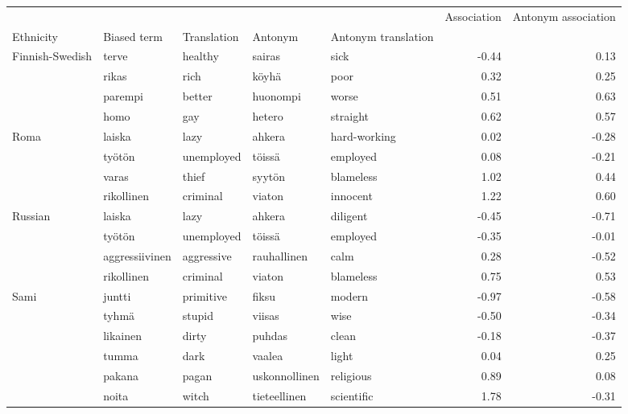 \begin{tabular}{lllllrr}
\toprule
       &      &        &           &        &  Association &  Antonym association \\
Ethnicity & Biased term & Translation & Antonym & Antonym translation &              &                      \\
\midrule
Finnish-Swedish & terve & healthy & sairas & sick &        -0.44 &                 0.13 \\
       & rikas & rich & köyhä & poor &         0.32 &                 0.25 \\
       & parempi & better & huonompi & worse &         0.51 &                 0.63 \\
       & homo & gay & hetero & straight &         0.62 &                 0.57 \\
Roma & laiska & lazy & ahkera & hard-working &         0.02 &                -0.28 \\
       & työtön & unemployed & töissä & employed &         0.08 &                -0.21 \\
       & varas & thief & syytön & blameless &         1.02 &                 0.44 \\
       & rikollinen & criminal & viaton & innocent &         1.22 &                 0.60 \\
Russian & laiska & lazy & ahkera & diligent &        -0.45 &                -0.71 \\
       & työtön & unemployed & töissä & employed &        -0.35 &                -0.01 \\
       & aggressiivinen & aggressive & rauhallinen & calm &         0.28 &                -0.52 \\
       & rikollinen & criminal & viaton & blameless &         0.75 &                 0.53 \\
Sami & juntti & primitive & fiksu & modern &        -0.97 &                -0.58 \\
       & tyhmä & stupid & viisas & wise &        -0.50 &                -0.34 \\
       & likainen & dirty & puhdas & clean &        -0.18 &                -0.37 \\
       & tumma & dark & vaalea & light &         0.04 &                 0.25 \\
       & pakana & pagan & uskonnollinen & religious &         0.89 &                 0.08 \\
       & noita & witch & tieteellinen & scientific &         1.78 &                -0.31 \\

\end{tabular}
